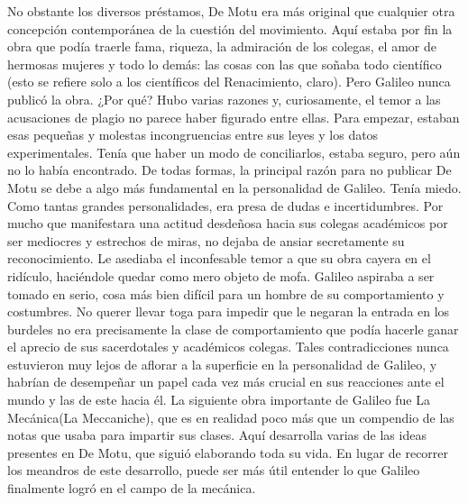 \documentclass[letterpaper, 10pt, journal]{IEEEtran}
\begin{document}
\newline
No obstante los diversos préstamos, De Motu era más original que cualquier otra concepción contemporánea de la cuestión del movimiento. Aquí estaba por fin la obra que podía traerle fama, riqueza, la admiración de los colegas, el amor de hermosas mujeres y todo lo demás: las cosas con las que soñaba todo científico (esto se refiere solo a los científicos del Renacimiento, claro). Pero Galileo nunca publicó la obra. ¿Por qué?
\newline
Hubo varias razones y, curiosamente, el temor a las acusaciones de plagio no parece haber figurado entre ellas. Para empezar, estaban esas pequeñas y molestas incongruencias entre sus leyes y los datos experimentales. Tenía que haber un modo de conciliarlos, estaba seguro, pero aún no lo había encontrado. De todas formas, la principal razón para no publicar De Motu se debe a algo más fundamental en la personalidad de Galileo. Tenía miedo. Como tantas grandes personalidades, era presa de dudas e incertidumbres. Por mucho que manifestara una actitud desdeñosa hacia sus colegas académicos por ser mediocres y estrechos de miras, no dejaba de ansiar secretamente su reconocimiento. Le asediaba el inconfesable temor a que su obra cayera en el ridículo, haciéndole quedar como mero objeto de mofa. Galileo aspiraba a ser tomado en serio, cosa más bien difícil para un hombre de su comportamiento y costumbres. No querer llevar toga para impedir que le negaran la entrada en los burdeles no era precisamente la clase de comportamiento que podía hacerle ganar el aprecio de sus sacerdotales y académicos colegas. Tales contradicciones nunca estuvieron muy lejos de aflorar a la superficie en la personalidad de Galileo, y habrían de desempeñar un papel cada vez más crucial en sus reacciones ante el mundo y las de este hacia él.
\newline
La siguiente obra importante de Galileo fue La Mecánica(La Meccaniche), que es en realidad poco más que un compendio de las notas que usaba para impartir sus clases. Aquí desarrolla varias de las ideas presentes en De Motu, que siguió elaborando toda su vida. En lugar de recorrer los meandros de este desarrollo, puede ser más útil entender lo que Galileo finalmente logró en el campo de la mecánica.
\newline
\end{document}
